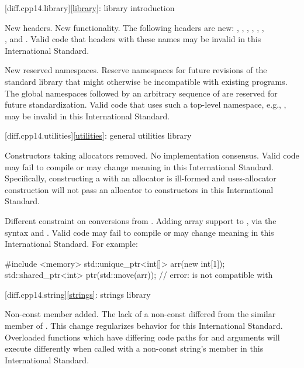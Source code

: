 [diff.cpp14.library]{\ref{library}: library introduction}

\change
New headers.
\rationale
New functionality.
\effect
The following \Cpp{} headers are new:
,
,
,
,
,
,\\
,
and
.
Valid \CppXIV{} code that  headers with these names may be
invalid in this International Standard.

\change
New reserved namespaces.
\rationale
Reserve namespaces for future revisions of the standard library
that might otherwise be incompatible with existing programs.
\effect
The global namespaces 
followed by an arbitrary sequence of 
are reserved for future standardization.
Valid \CppXIV{} code that uses such a top-level namespace,
e.g., , may be invalid in this International Standard.

[diff.cpp14.utilities]{\ref{utilities}: general utilities library}

\change
Constructors taking allocators removed.
\rationale
No implementation consensus.
\effect
Valid \CppXIV{} code may fail to compile or may change meaning in this
International Standard. Specifically, constructing a  with
an allocator is ill-formed and uses-allocator construction will not pass an
allocator to  constructors in this International Standard.

\change
Different constraint on conversions from .
\rationale
Adding array support to ,
via the syntax  and .
\effect
Valid \CppXIV{} code may fail to compile or may change meaning in this
International Standard.
For example:
\begin{codeblock}
#include <memory>
std::unique_ptr<int[]> arr(new int[1]);
std::shared_ptr<int> ptr(std::move(arr));   // error:  is not compatible with 
\end{codeblock}

[diff.cpp14.string]{\ref{strings}: strings library}

\change
Non-const  member added.
\rationale
The lack of a non-const 
differed from the similar member of .
This change regularizes behavior for this International Standard.
\effect
Overloaded functions which have differing code paths
for  and  arguments
will execute differently
when called with a non-const string's  member
in this International Standard.

